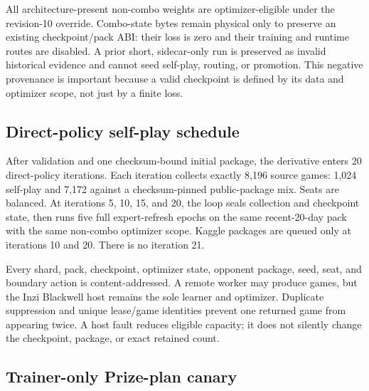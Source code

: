 All architecture-present non-combo weights are optimizer-eligible under the
revision-10 override. Combo-state bytes remain physical only to preserve an
existing checkpoint/pack ABI: their loss is zero and their training and runtime
routes are disabled. A prior short, sidecar-only run is preserved as invalid
historical evidence and cannot seed self-play, routing, or promotion. This
negative provenance is important because a valid checkpoint is defined by its
data and optimizer scope, not just by a finite loss.

\subsection{Direct-policy self-play schedule}

After validation and one checksum-bound initial package, the derivative enters
20 direct-policy iterations. Each iteration collects exactly 8,196 source
games: 1,024 self-play and 7,172 against a checksum-pinned public-package mix.
Seats are balanced. At iterations 5, 10, 15, and 20, the loop seals collection
and checkpoint state, then runs five full expert-refresh epochs on the same
recent-20-day pack with the same non-combo optimizer scope. Kaggle packages are
queued only at iterations 10 and 20. There is no iteration 21.

Every shard, pack, checkpoint, optimizer state, opponent package, seed, seat,
and boundary action is content-addressed. A remote worker may produce games,
but the Inzi Blackwell host remains the sole learner and optimizer. Duplicate
suppression and unique lease/game identities prevent one returned game from
appearing twice. A host fault reduces eligible capacity; it does not silently
change the checkpoint, package, or exact retained count.

\subsection{Trainer-only Prize-plan canary}

